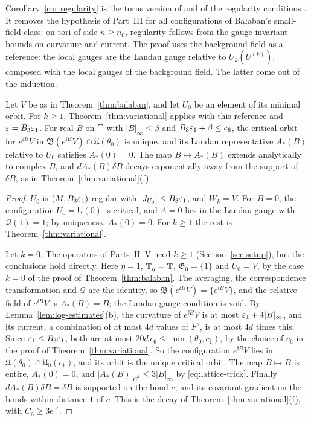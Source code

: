 Corollary~\ref{cor:regularity} is the torus version of \cite[Sect.~F, Prop.~6]{BalReg} and of the regularity conditions \cite[(3.35)--(3.36)]{BalBackground}. It removes the hypothesis of Part~III for all configurations of Ba\l aban's small-field class: on tori of side $n\ge n_0$, regularity follows from the gauge-invariant bounds on curvature and current. The proof uses the background field as a reference: the local gauges are the Landau gauge relative to $U_k(U^{(k)})$, composed with the local gauges of the background field. The latter come out of the induction.

\begin{corollary}\label{cor:analytic}
Let $V$ be as in Theorem~\ref{thm:balaban}, and let $U_0$ be an element of its minimal orbit. For $k\ge1$, Theorem~\ref{thm:variational} applies with this reference and $\varepsilon=B_3\varepsilon_1$. For real $B$ on $\mathbb T$ with $|B|_\infty\le\beta$ and $B_3\varepsilon_1+\beta\le c_6$, the critical orbit for $e^{\ii B}V$ in $\mathfrak B(e^{\ii B}V)\cap\mathfrak U(\theta_0)$ is unique, and its Landau representative $A_*(B)$ relative to $U_0$ satisfies $A_*(0)=0$. The map $B\mapsto A_*(B)$ extends analytically to complex $B$, and $dA_*(B)\delta B$ decays exponentially away from the support of $\delta B$, as in Theorem~\ref{thm:variational}(f).
\end{corollary}

\begin{proof}
$U_0$ is $(M,B_3\varepsilon_1)$-regular with $|J_{U_0}|\le B_3\varepsilon_1$, and $W_k=V$. For $B=0$, the configuration $U_0=\mathsf U(0)$ is critical, and $A=0$ lies in the Landau gauge with $\mathcal Q(1)=1$; by uniqueness, $A_*(0)=0$. For $k\ge1$ the rest is Theorem~\ref{thm:variational}.

Let $k=0$. The operators of Parts~II--V need $k\ge1$ (Section~\ref{sec:setup}), but the conclusions hold directly. Here $\eta=1$, $\mathbb T_\eta=\mathbb T$, $\mathfrak G_0=\{1\}$ and $U_0=V$, by the case $k=0$ of the proof of Theorem~\ref{thm:balaban}. The averaging, the correspondence transformation and $\mathcal Q$ are the identity, so $\mathfrak B(e^{\ii B}V)=\{e^{\ii B}V\}$, and the relative field of $e^{\ii B}V$ is $A_*(B)=B$; the Landau gauge condition is void. By Lemma~\ref{lem:log-estimates}(b), the curvature of $e^{\ii B}V$ is at most $\varepsilon_1+4|B|_\infty$, and its current, a combination of at most $4d$ values of $F^s$, is at most $4d$ times this. Since $\varepsilon_1\le B_3\varepsilon_1$, both are at most $20d\,c_6\le\min(\theta_0,c_1)$, by the choice of $c_6$ in the proof of Theorem~\ref{thm:variational}. So the configuration $e^{\ii B}V$ lies in $\mathfrak U(\theta_0)\cap\mathfrak U_0(c_1)$, and its orbit is the unique critical orbit. The map $B\mapsto B$ is entire, $A_*(0)=0$, and $|A_*(B)|_{C^1}\le3|B|_\infty$ by \eqref{eq:lattice-trick}. Finally $dA_*(B)\delta B=\delta B$ is supported on the bond $c$, and its covariant gradient on the bonds within distance $1$ of $c$. This is the decay of Theorem~\ref{thm:variational}(f), with $C_6\ge3e^{\gamma'}$.
\end{proof}

